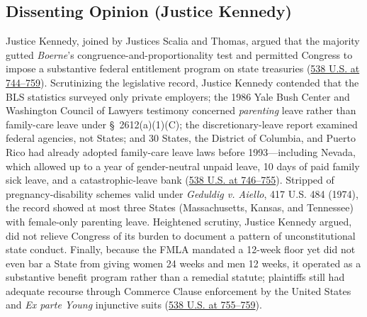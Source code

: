 \documentclass[12pt]{article}
\begin{document}
\subsection{Dissenting Opinion (Justice Kennedy)}
Justice Kennedy, joined by Justices Scalia and Thomas, argued that the majority gutted \textit{Boerne}'s congruence-and-proportionality test and permitted Congress to impose a substantive federal entitlement program on state treasuries (\href{https://supreme.justia.com/cases/federal/us/538/721/}{538 U.S. at 744--759}). Scrutinizing the legislative record, Justice Kennedy contended that the BLS statistics surveyed only private employers; the 1986 Yale Bush Center and Washington Council of Lawyers testimony concerned \textit{parenting} leave rather than family-care leave under \S~2612(a)(1)(C); the discretionary-leave report examined federal agencies, not States; and 30 States, the District of Columbia, and Puerto Rico had already adopted family-care leave laws before 1993---including Nevada, which allowed up to a year of gender-neutral unpaid leave, 10 days of paid family sick leave, and a catastrophic-leave bank (\href{https://supreme.justia.com/cases/federal/us/538/721/}{538 U.S. at 746--755}). Stripped of pregnancy-disability schemes valid under \textit{Geduldig v. Aiello}, 417 U.S. 484 (1974), the record showed at most three States (Massachusetts, Kansas, and Tennessee) with female-only parenting leave. Heightened scrutiny, Justice Kennedy argued, did not relieve Congress of its burden to document a pattern of unconstitutional state conduct. Finally, because the FMLA mandated a 12-week floor yet did not even bar a State from giving women 24 weeks and men 12 weeks, it operated as a substantive benefit program rather than a remedial statute; plaintiffs still had adequate recourse through Commerce Clause enforcement by the United States and \textit{Ex parte Young} injunctive suits (\href{https://supreme.justia.com/cases/federal/us/538/721/}{538 U.S. at 755--759}).
\end{document}

